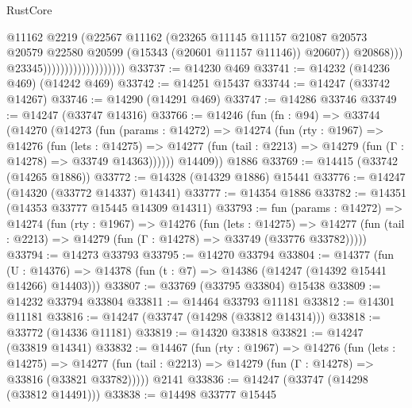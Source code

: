 \begin{lexlean}{RustCore}
\begin{coremodule}
                                                @11162
                                                @2219
                                                (@22567
                                                  @11162
                                                  (@23265
                                                    @11145
                                                    @11157
                                                    @21087
                                                    @20573
                                                    @20579
                                                    @22580
                                                    @20599
                                                    (@15343 (@20601 @11157 @11146))
                                                    @20607))
                                                @20868)))
                                          @23345)))))))))))))))))))
@33737 := @14230 @469
@33741 := @14232 (@14236 @469) (@14242 @469)
@33742 := @14251 @15437
@33744 := @14247 (@33742 @14267)
@33746 := @14290 (@14291 @469)
@33747 := @14286 @33746
@33749 := @14247 (@33747 @14316)
@33766 := @14246
    (fun (fn : @94) =>
    @33744
      (@14270
        (@14273
          (fun (params : @14272) =>
          @14274
            (fun (rty : @1967) =>
            @14276
              (fun (lets : @14275) =>
              @14277 (fun (tail : @2213) => @14279 (fun (Γ : @14278) => @33749 @14363))))))
        @14409))
    @1886
@33769 := @14415 (@33742 (@14265 @1886))
@33772 := @14328 (@14329 @1886) @15441
@33776 := @14247 (@14320 (@33772 @14337) @14341)
@33777 := @14354 @1886
@33782 := @14351 (@14353 @33777 @15445 @14309 @14311)
@33793 := fun (params : @14272) =>
  @14274
    (fun (rty : @1967) =>
    @14276
      (fun (lets : @14275) =>
      @14277 (fun (tail : @2213) => @14279 (fun (Γ : @14278) => @33749 (@33776 @33782)))))
@33794 := @14273 @33793
@33795 := @14270 @33794
@33804 := @14377
    (fun (U : @14376) => @14378 (fun (t : @7) => @14386 (@14247 (@14392 @15441 @14266) @14403)))
@33807 := @33769 (@33795 @33804) @15438
@33809 := @14232 @33794 @33804
@33811 := @14464 @33793 @11181
@33812 := @14301 @11181
@33816 := @14247 (@33747 (@14298 (@33812 @14314)))
@33818 := @33772 (@14336 @11181)
@33819 := @14320 @33818
@33821 := @14247 (@33819 @14341)
@33832 := @14467
    (fun (rty : @1967) =>
    @14276
      (fun (lets : @14275) =>
      @14277 (fun (tail : @2213) => @14279 (fun (Γ : @14278) => @33816 (@33821 @33782)))))
    @2141
@33836 := @14247 (@33747 (@14298 (@33812 @14491)))
@33838 := @14498 @33777 @15445

\end{coremodule}
\end{lexlean}
